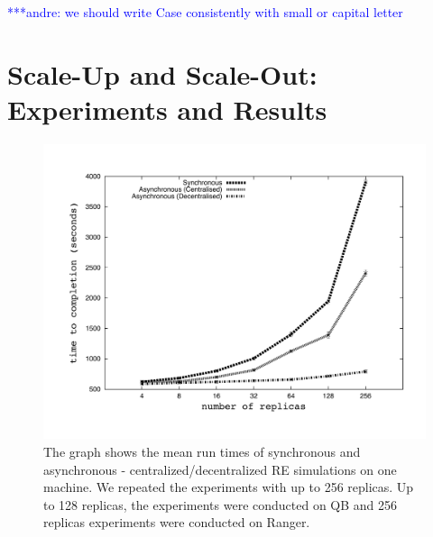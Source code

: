 \documentclass[a4paper,10pt]{article}
\newcommand{\jhanote}[1]{ {\textcolor{red} { ***shantenu: #1 }}}
\newcommand{\alnote}[1]{ {\textcolor{blue} { ***andre: #1 }}}
\newcommand{\alnote}[1]{}
\newcommand{\jhanote}[1]{}
\begin{document}
\alnote{we should write Case consistently with small or capital letter}

\section{Scale-Up and Scale-Out: Experiments and Results}

%
\begin{figure}
\centering
\includegraphics[scale=0.50]{data/scale_up.pdf}
\caption{\small The graph shows the mean run times of synchronous and asynchronous - centralized/decentralized RE simulations on one machine. We repeated the experiments with up to 256 replicas. Up to 128 replicas, the experiments were conducted on QB and 256 replicas experiments were conducted on Ranger.}
\label{fig:graph}
\vspace{-1em}
\end{figure}
\end{document}
